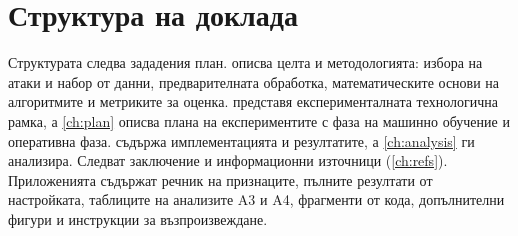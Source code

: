 \section*{Структура на доклада}
Структурата следва зададения план.  описва целта и методологията: избора на атаки и набор от данни, предварителната обработка, математическите основи на алгоритмите и метриките за оценка.  представя експерименталната технологична рамка, а \cref{ch:plan} описва плана на експериментите с фаза на машинно обучение и оперативна фаза.  съдържа имплементацията и резултатите, а \cref{ch:analysis} ги анализира. Следват заключение и информационни източници (\cref{ch:refs}). Приложенията съдържат речник на признаците, пълните резултати от настройката, таблиците на анализите A3 и A4, фрагменти от кода, допълнителни фигури и инструкции за възпроизвеждане.
